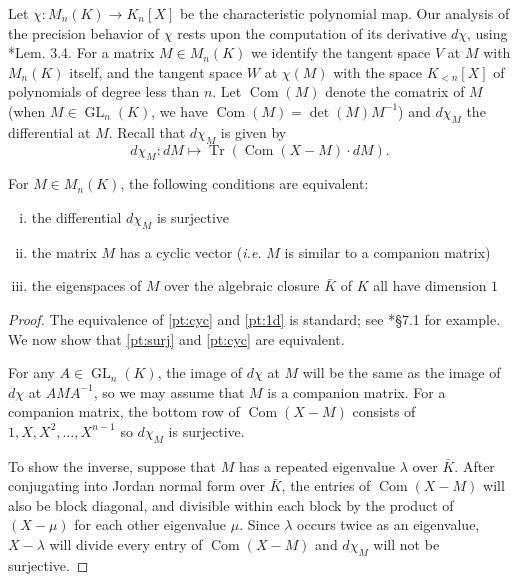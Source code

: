 \documentclass{sig-alternate-05-2015}
\DeclareMathOperator{\GL}{GL}
\DeclareMathOperator{\tr}{Tr}
\DeclareMathOperator{\com}{Com}
\begin{document}
Let $\chi : M_n(K) \to K_n[X]$ be the characteristic polynomial map.
Our analysis of the precision behavior of $\chi$ rests upon
the computation of its derivative $d\chi$, using \cite{caruso-roe-vaccon:14a}*{Lem. 3.4}.
For a matrix $M \in M_n(K)$ we identify the tangent space $V$
at $M$ with $M_n(K)$ itself, and the tangent space $W$ at $\chi(M)$ with
the space $K_{<n}[X]$ of polynomials of degree less than $n$.
Let $\com(M)$ denote the comatrix of $M$ (when $M \in \GL_n(K)$,
we have $\com(M) = \det(M) M^{-1}$) and $d\chi_M$ the differential at $M$.  Recall
that $d\chi_M$ is given by
\begin{equation} \label{eq:dchi}
d\chi_M: dM \mapsto \tr(\com(X-M) \cdot dM).
\end{equation}

\begin{prop}
\label{prop:surjectivity}
For $M \in M_n(K)$, the following conditions are equivalent:
\begin{enumerate}[(i)]
\renewcommand{\itemsep}{0pt}
\item \label{pt:surj} the differential $d\chi_M$ is surjective
\item \label{pt:cyc} the matrix $M$ has a cyclic vector (\emph{i.e.} $M$ is similar
to a companion matrix)
\item \label{pt:1d} the eigenspaces of $M$ over the algebraic
closure $\bar{K}$ of $K$ all have dimension $1$
\end{enumerate}
\end{prop}

\begin{proof}
The equivalence of \eqref{pt:cyc} and \eqref{pt:1d} is standard; see
\cite{hoffman-kunze:LinearAlgebra}*{\S 7.1} for example.  We now show
that \eqref{pt:surj} and \eqref{pt:cyc} are equivalent.

For any $A \in \GL_n(K)$, the image of $d\chi$ at $M$ will be the same
as the image of $d\chi$ at $AMA^{-1}$, so we may assume that
$M$ is a companion matrix.  For a companion matrix, the bottom row of
$\com(X-M)$ consists of $1, X, X^2, \dots, X^{n-1}$ so $d\chi_M$ is surjective.

To show the inverse, suppose that $M$ has a repeated eigenvalue $\lambda$ over $\bar{K}$.
After conjugating into Jordan normal form over $\bar{K}$, the entries of $\com(X-M)$
will also be block diagonal, and divisible within each block by the product of $(X-\mu)$
for each other eigenvalue $\mu$.  Since $\lambda$ occurs twice as an eigenvalue,
$X - \lambda$ will divide every entry of $\com(X-M)$ and $d\chi_M$ will not be surjective.
\end{proof}
\end{document}
